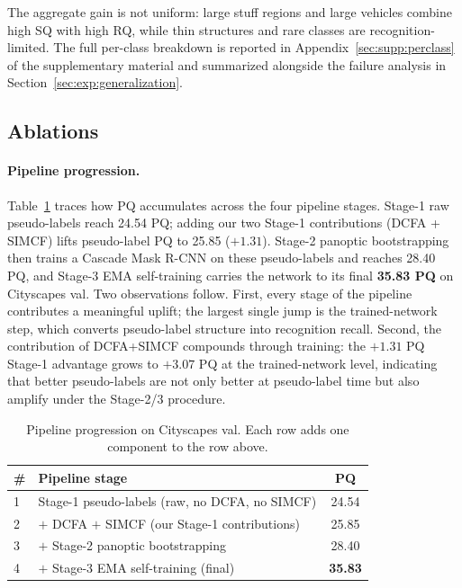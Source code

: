 \documentclass{article}
\begin{document}
The aggregate gain is not uniform: large stuff regions and large vehicles combine high SQ with high RQ, while thin structures and rare classes are recognition-limited. The full per-class breakdown is reported in Appendix~\ref{sec:supp:perclass} of the supplementary material and summarized alongside the failure analysis in Section~\ref{sec:exp:generalization}.

\subsection{Ablations}
\label{sec:exp:ablations}

\paragraph{Pipeline progression.}
Table~\ref{tab:progression} traces how PQ accumulates across the four pipeline stages. Stage-1 raw pseudo-labels reach 24.54 PQ; adding our two Stage-1 contributions (DCFA + SIMCF) lifts pseudo-label PQ to 25.85 ($+1.31$). Stage-2 panoptic bootstrapping then trains a Cascade Mask R-CNN on these pseudo-labels and reaches 28.40 PQ, and Stage-3 EMA self-training carries the network to its final \textbf{35.83 PQ} on Cityscapes val. Two observations follow. First, every stage of the pipeline contributes a meaningful uplift; the largest single jump is the trained-network step, which converts pseudo-label structure into recognition recall. Second, the contribution of DCFA+SIMCF compounds through training: the $+1.31$ PQ Stage-1 advantage grows to $+3.07$ PQ at the trained-network level, indicating that better pseudo-labels are not only better at pseudo-label time but also amplify under the Stage-2/3 procedure.

\begin{table}[tbp]
\caption{Pipeline progression on Cityscapes val. Each row adds one component to the row above.}
\label{tab:progression}
\centering
\small
\setlength{\tabcolsep}{3pt}
\begin{tabular}{l l c}
\toprule
\# & Pipeline stage & PQ \\
\midrule
1 & Stage-1 pseudo-labels (raw, no DCFA, no SIMCF) & 24.54 \\
2 & \quad $+$ DCFA $+$ SIMCF (our Stage-1 contributions) & 25.85 \\
3 & \quad $+$ Stage-2 panoptic bootstrapping & 28.40 \\
4 & \quad $+$ Stage-3 EMA self-training (final) & \textbf{35.83} \\
\bottomrule
\end{tabular}
\end{table}
\end{document}
